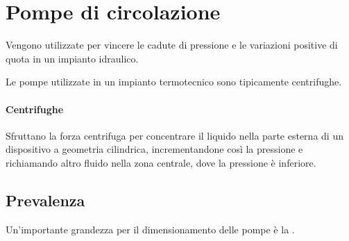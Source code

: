 %
\section{Pompe di circolazione}
Vengono utilizzate per vincere le cadute di pressione e le variazioni positive di quota in un impianto idraulico.

Le pompe utilizzate in un impianto termotecnico sono tipicamente centrifughe.
%
\paragraph{Centrifughe} Sfruttano la forza centrifuga per concentrare il liquido nella parte esterna di un dispositivo a geometria cilindrica, incrementandone così la pressione e richiamando altro fluido nella zona centrale, dove la pressione è inferiore.
%
\subsection{Prevalenza}
Un'importante grandezza per il dimensionamento delle pompe è la .

